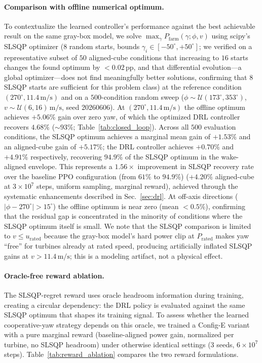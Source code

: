\documentclass[final,5p,times]{elsarticle}
\begin{document}
\paragraph{Comparison with offline numerical optimum.}
To contextualize the learned controller's performance against the best achievable result on the same gray-box model, we solve $\max_\gamma P_\mathrm{farm}(\gamma;\phi,v)$ using scipy's SLSQP optimizer ($8$ random starts, bounds $\gamma_i\!\in\![-50^\circ,+50^\circ]$; we verified on a representative subset of $50$ aligned-cube conditions that increasing to $16$ starts changes the found optimum by $<0.02$\,pp, and that differential evolution---a global optimizer---does not find meaningfully better solutions, confirming that $8$ SLSQP starts are sufficient for this problem class) at the reference condition $(270^\circ, 11.4\,\mathrm{m/s})$ and on a $500$-condition random sweep ($\phi\!\sim\!\mathcal{U}(173^\circ,353^\circ)$, $v\!\sim\!\mathcal{U}(6,16)\,\mathrm{m/s}$, seed 20260606). At $(270^\circ, 11.4\,\mathrm{m/s})$ the offline optimum achieves $+5.06\%$ gain over zero yaw, of which the optimized DRL controller recovers $4.68\%$ ($\sim\!93\%$; Table~\ref{tab:closed_loop}). Across all $500$ evaluation conditions, the SLSQP optimum achieves a marginal mean gain of $+1.53\%$ and an aligned-cube gain of $+5.17\%$; the DRL controller achieves $+0.70\%$ and $+4.91\%$ respectively, recovering $\mathbf{94.9\%}$ of the SLSQP optimum in the wake-aligned envelope. This represents a $1.56{\times}$ improvement in SLSQP recovery rate over the baseline PPO configuration (from $61\%$ to $94.9\%$) ($+4.20\%$ aligned-cube at $3{\times}10^{7}$ steps, uniform sampling, marginal reward), achieved through the systematic enhancements described in Sec.~\ref{sec:drl}. At off-axis directions ($|\phi\!-\!270^\circ|\!>\!15^\circ$) the offline optimum is near zero (mean $<\!0.5\%$), confirming that the residual gap is concentrated in the minority of conditions where the SLSQP optimum itself is small. We note that the SLSQP comparison is limited to $v\!\leq\!u_\mathrm{rated}$ because the gray-box model's hard power clip at $P_\mathrm{rated}$ makes yaw ``free'' for turbines already at rated speed, producing artificially inflated SLSQP gains at $v\!>\!11.4\,\mathrm{m/s}$; this is a modeling artifact, not a physical effect.

\paragraph{Oracle-free reward ablation.}
The SLSQP-regret reward uses oracle headroom information during training, creating a circular dependency: the DRL policy is evaluated against the same SLSQP optimum that shapes its training signal. To assess whether the learned cooperative-yaw strategy depends on this oracle, we trained a Config-E variant with a pure marginal reward (baseline-aligned power gain, normalized per turbine, no SLSQP headroom) under otherwise identical settings (3 seeds, $6{\times}10^{7}$ steps). Table~\ref{tab:reward_ablation} compares the two reward formulations.
\end{document}
